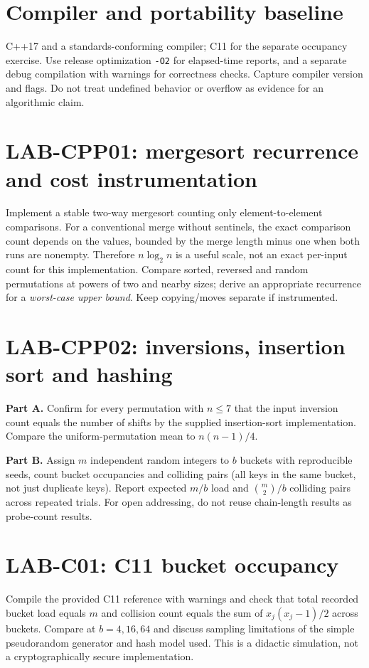 \documentclass[11pt]{article}
\begin{document}
\makedoctocpage

\section{Compiler and portability baseline}
C++17 and a standards-conforming compiler; C11 for the separate occupancy exercise. Use release optimization \texttt{-O2} for elapsed-time reports, and a separate debug compilation with warnings for correctness checks. Capture compiler version and flags. Do not treat undefined behavior or overflow as evidence for an algorithmic claim.
\section{LAB-CPP01: mergesort recurrence and cost instrumentation}
Implement a stable two-way mergesort counting only element-to-element comparisons. For a conventional merge without sentinels, the exact comparison count depends on the values, bounded by the merge length minus one when both runs are nonempty. Therefore $n\log_2n$ is a useful scale, not an exact per-input count for this implementation. Compare sorted, reversed and random permutations at powers of two and nearby sizes; derive an appropriate recurrence for a \emph{worst-case upper bound}. Keep copying/moves separate if instrumented.
\section{LAB-CPP02: inversions, insertion sort and hashing}
\textbf{Part A.} Confirm for every permutation with $n\le7$ that the input inversion count equals the number of shifts by the supplied insertion-sort implementation. Compare the uniform-permutation mean to $n(n-1)/4$.\par
\textbf{Part B.} Assign $m$ independent random integers to $b$ buckets with reproducible seeds, count bucket occupancies and colliding pairs (all keys in the same bucket, not just duplicate keys). Report expected $m/b$ load and $\binom m2/b$ colliding pairs across repeated trials. For open addressing, do not reuse chain-length results as probe-count results.
\section{LAB-C01: C11 bucket occupancy}
Compile the provided C11 reference with warnings and check that total recorded bucket load equals $m$ and collision count equals the sum of $x_j(x_j-1)/2$ across buckets. Compare at $b=4,16,64$ and discuss sampling limitations of the simple pseudorandom generator and hash model used. This is a didactic simulation, not a cryptographically secure implementation.
\end{document}
